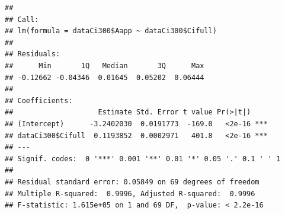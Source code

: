 \documentclass[
]{krantz}
\makeatletter
\newenvironment{Shaded}{\begin{snugshade}}{\end{snugshade}}
\newcommand{\DecValTok}[1]{\textcolor[rgb]{0.00,0.00,0.81}{#1}}
\newcommand{\FunctionTok}[1]{\textcolor[rgb]{0.00,0.00,0.00}{#1}}
\newcommand{\NormalTok}[1]{#1}
\newcommand{\OtherTok}[1]{\textcolor[rgb]{0.56,0.35,0.01}{#1}}
\newcommand{\SpecialCharTok}[1]{\textcolor[rgb]{0.00,0.00,0.00}{#1}}
\newenvironment{kframe}{%
\medskip{}
\setlength{\fboxsep}{.8em}
 \def\at@end@of@kframe{}%
 \ifinner\ifhmode%
  \def\at@end@of@kframe{\end{minipage}}%
  \begin{minipage}{\columnwidth}%
 \fi\fi%
 \def\FrameCommand##1{\hskip\@totalleftmargin \hskip-\fboxsep
 \colorbox{shadecolor}{##1}\hskip-\fboxsep
     \hskip-\linewidth \hskip-\@totalleftmargin \hskip\columnwidth}%
 \MakeFramed {\advance\hsize-\width
   \@totalleftmargin\z@ \linewidth\hsize
   \@setminipage}}%
 {\par\unskip\endMakeFramed%
 \at@end@of@kframe}
\renewenvironment{Shaded}{\begin{kframe}}{\end{kframe}}
\makeatother
\begin{document}
\begin{Shaded}
\end{Shaded}

\begin{verbatim}
## 
## Call:
## lm(formula = dataCi300$Aapp ~ dataCi300$Cifull)
## 
## Residuals:
##      Min       1Q   Median       3Q      Max 
## -0.12662 -0.04346  0.01645  0.05202  0.06444 
## 
## Coefficients:
##                    Estimate Std. Error t value Pr(>|t|)    
## (Intercept)      -3.2402030  0.0191773  -169.0   <2e-16 ***
## dataCi300$Cifull  0.1193852  0.0002971   401.8   <2e-16 ***
## ---
## Signif. codes:  0 '***' 0.001 '**' 0.01 '*' 0.05 '.' 0.1 ' ' 1
## 
## Residual standard error: 0.05849 on 69 degrees of freedom
## Multiple R-squared:  0.9996, Adjusted R-squared:  0.9996 
## F-statistic: 1.615e+05 on 1 and 69 DF,  p-value: < 2.2e-16
\end{verbatim}
\end{document}
